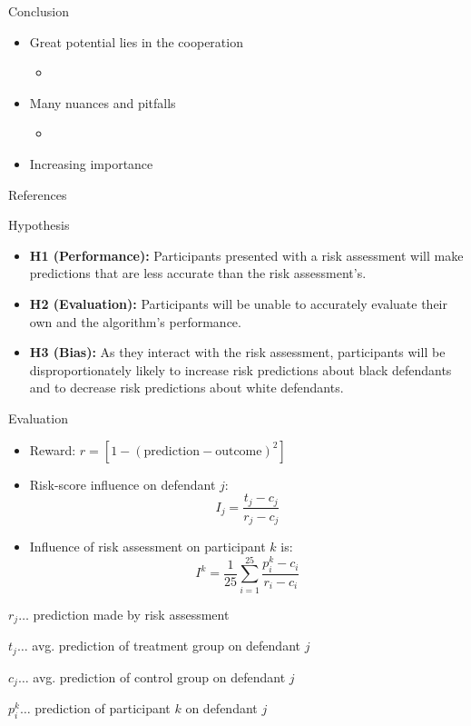 \documentclass[11pt]{beamer}
\begin{document}
\begin{frame}{Conclusion}
\begin{itemize}
    \item Great potential lies in the cooperation
    \begin{itemize}
        \item \cite{polson2018aiq}
    \end{itemize}
    \item Many nuances and pitfalls
    \begin{itemize}
        \item \cite{hamilton2015adventures}
    \end{itemize}
    \item Increasing importance
\end{itemize}
\end{frame}

\begin{frame}{References}
\scriptsize


\end{frame}

\begin{frame}{Hypothesis}
\begin{itemize}
	\item \textbf{H1 (Performance): }Participants presented with a
	risk assessment will make predictions that are less accurate
	than the risk assessment’s.
	\item \textbf{H2 (Evaluation): }Participants will be unable to accurately evaluate their own and the algorithm’s performance.
	\item \textbf{H3 (Bias): }As they interact with the risk assessment, participants will be disproportionately likely to increase risk predictions about black defendants and to decrease risk predictions about white defendants.
\end{itemize}
\end{frame}

\begin{frame}{Evaluation}
\begin{itemize}
	\item Reward: $r = [1-(\text{prediction}-\text{outcome})^2]$\\
	\item Risk-score influence on defendant $j$: $$I_j = \frac{t_j - c_j}{r_j - c_j}$$
	\item Influence of risk assessment on participant $k$ is: $$I^k = \frac{1}{25}\sum^{25}_{i=1}\frac{p_i^k -c_i}{r_i-c_i}$$
\end{itemize}
{\footnotesize
$r_j \ldots$ prediction made by risk assessment 

$t_j \ldots$ avg. prediction of treatment group on defendant $j$ 

$c_j \ldots$ avg. prediction of control group on defendant $j$ 

$p_i^k \ldots$ prediction of participant $k$ on defendant $j$
}

\end{frame}
\end{document}
